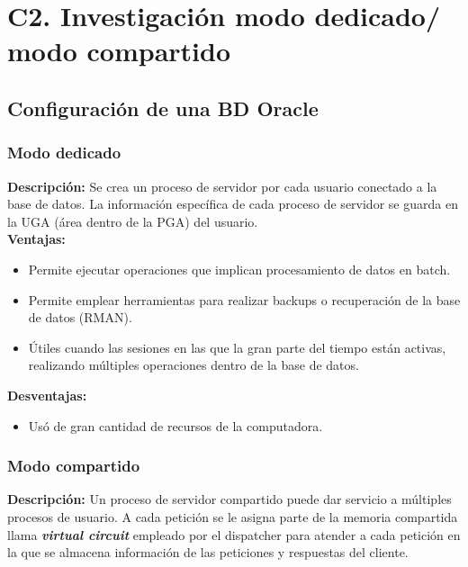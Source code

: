 \documentclass{article}
\begin{document}
\section*{C2. Investigación modo dedicado/ modo compartido }

\subsection*{Configuración de una BD Oracle}

\subsubsection*{Modo dedicado}

\textbf{Descripción:} 
Se crea un proceso de servidor por cada usuario conectado a la base de datos. 
La información específica de cada proceso de servidor se guarda en la UGA 
(área dentro de la PGA) del usuario.\\

\textbf{Ventajas:}
\begin{itemize}
    \item Permite ejecutar operaciones que implican procesamiento de datos en batch.
    \item Permite emplear herramientas para realizar backups o recuperación 
      de la base de datos (RMAN).
    \item Útiles cuando las sesiones en las que la gran parte del tiempo están activas, 
    realizando múltiples operaciones dentro de la base de datos. \\
\end{itemize} 

\textbf{Desventajas:}
\begin{itemize}
    \item Usó de gran cantidad de recursos de la computadora.
\end{itemize}

\subsubsection*{Modo compartido}

\textbf{Descripción:} 
Un proceso de servidor compartido puede dar servicio a múltiples procesos de usuario. 
A cada petición se le asigna parte de la memoria compartida llama 
\textit{\textbf{virtual circuit}} empleado por el dispatcher para atender a cada petición
en la que se almacena información de las peticiones y respuestas del cliente. \\
\end{document}
